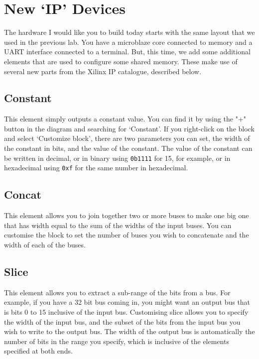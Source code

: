\documentclass[../physical_computing.tex]{subfiles}
\begin{document}
\section{New `IP' Devices}
\label{sec:appendix_8_devices}

The hardware I would like you to build today starts with the same layout that we used in the previous lab. You have a microblaze core connected to memory and a UART interface connected to a terminal. But, this time, we add some additional elements that are used to configure some shared memory. These make use of several new parts from the Xilinx IP catalogue, described below.

\subsection{Constant}
\label{sec:appendix_8_constant}

This element simply outputs a constant value. You can find it by using the "+" button in the diagram and searching for `Constant'. If you right-click on the block and select `Customize block', there are two parameters you can set, the width of the constant in bits, and the value of the constant. The value of the constant can be written in decimal, or in binary using \texttt{0b1111} for 15, for example, or in hexadecimal using \texttt{0xf} for the same number in hexadecimal.

\subsection{Concat}
\label{sec:appendix_8_concat}

This element allows you to join together two or more buses to make one big one that has width equal to the sum of the widths of the input buses. You can customise the block to set the number of buses you wish to concatenate and the width of each of the buses.

\subsection{Slice}
\label{sec:appendix_8_slice}

This element allows you to extract a sub-range of the bits from a bus. For example, if you have a 32 bit bus coming in, you might want an output bus that is bits 0 to 15 inclusive of the input bus. Customising slice allows you to specify the width of the input bus, and the subset of the bits from the input bus you wish to write to the output bus. The width of the output bus is automatically the number of bits in the range you specify, which is inclusive of the elements specified at both ends.
\end{document}
